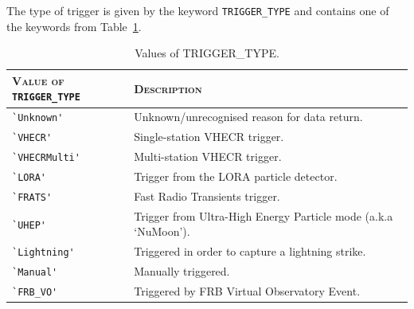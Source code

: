 \documentclass[a4paper,10pt,bibtotoc]{scrartcl}
\begin{document}
The type of trigger is given by the keyword \verb|TRIGGER_TYPE| and
contains one of the keywords from Table~\ref{tab:trigger_types}.

\begin{table}[htb]
  \centering
  \begin{tabular}{|lp{9cm}|}
    \hline
    \textsc{Value of} \verb|TRIGGER_TYPE| & \textsc{Description} \\
    \hline
    \hline
    \verb|`Unknown'| & Unknown/unrecognised reason for data return. \\
    \verb|`VHECR'| & Single-station VHECR trigger.\\
    \verb|`VHECRMulti'| & Multi-station VHECR trigger.\\
    \verb|`LORA'| & Trigger from the LORA particle detector.\\
    \verb|`FRATS'| & Fast Radio Transients trigger.\\
    \verb|`UHEP'| & Trigger from Ultra-High Energy Particle mode (a.k.a `NuMoon').\\
    \verb|`Lightning'| & Triggered in order to capture a lightning strike.\\
    \verb|`Manual'| & Manually triggered.\\
    \verb|`FRB_VO'| & Triggered by FRB Virtual Observatory Event.\\
   \hline
  \end{tabular}
  \caption{Values of TRIGGER\_TYPE.}
  \label{tab:trigger_types}
\end{table}
\end{document}
